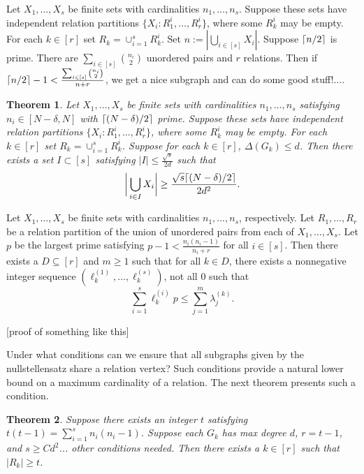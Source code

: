 \documentclass[12pt]{article}
\DeclarePairedDelimiter\ceil{\lceil}{\rceil}
\newtheorem{thm}{Theorem}[section] %
\theoremstyle{definition}
\begin{document}
	\iffalse
	Let $X_1,\ldots, X_s$ be finite sets with cardinalities $n_1,\ldots, n_s$.  Suppose these sets have independent relation partitions $\{X_i: R_1^{i},\ldots, R_r^{i}\}$, where some $R_k^{i}$ may be empty.  For each $k \in [r]$ set $R_k = \cup_{i=1}^s R_k^i$.  Set $n:= |\bigcup_{i \in [s]}X_i|$.  Suppose $\ceil{n/2}$ is prime.  There are $\sum_{i \in [s]}{n_i \choose 2}$ unordered pairs and $r$ relations.  Then if $\ceil{n/2} -1 < \frac{\sum_{i \in [s]}{n_i \choose 2}}{n+r}$, we get a nice subgraph and can do some good stuff!....
	
	\begin{thm}
		Let $X_1,\ldots, X_s$ be finite sets with cardinalities $n_1,\ldots, n_s$ satisfying $n_i \in [N-\delta, N]$ with $\ceil{(N-\delta)/2}$ prime.  Suppose these sets have independent relation partitions $\{X_i: R_1^{i},\ldots, R_r^{i}\}$, where some $R_k^{i}$ may be empty.  For each $k \in [r]$ set $R_k = \cup_{i=1}^s R_k^i$.  Suppose for each $k \in [r]$, $\Delta(G_k) \leq d$.  Then there exists a set $I \subset [s]$ satisfying $|I| \leq \frac{\sqrt{s}}{2d}$ such that
		$$\biggr|\bigcup_{i \in I}X_i \biggr| \geq \frac{\sqrt{s}\ceil{(N-\delta)/2}}{2d^2}.$$
	\end{thm}
	
	Let $X_1, \ldots, X_s$ be finite sets with cardinalities $n_1,\ldots, n_s$, respectively.  Let $R_1, \ldots, R_r$ be a relation partition of the union of unordered pairs from each of $X_1, \ldots, X_s$.  Let $p$ be the largest prime satisfying $p-1 < \tfrac{n_i(n_i-1)}{n_i+r}$ for all $i \in [s]$.  Then there exists a $D \subseteq [r]$ and $m \geq 1$ such that for all $k \in D$, there exists a nonnegative integer sequence $(\ell_k^{(1)}, \ldots, \ell_k^{(s)})$, not all $0$ such that
	$$ \sum_{i = 1}^s\ell_k^{(i)}p \leq \sum_{j=1}^m \lambda_j^{(k)}.$$
	
	[proof of something like this]
	
	Under what conditions can we ensure that all subgraphs given by the nullstellensatz share a relation vertex?  Such conditions provide a natural lower bound on a maximum cardinality of a relation.  The next theorem presents such a condition.
	
	\begin{thm}
		Suppose there exists an integer $t$ satisfying $t(t-1) = \sum_{i=1}^s n_i(n_i-1)$.  Suppose each $G_k$ has max degree $d$, $r = t-1$, and $s \geq Cd^2$... other conditions needed.  Then there exists a $k \in [r]$ such that $|R_k| \geq t$.
	\end{thm}
\end{document}
